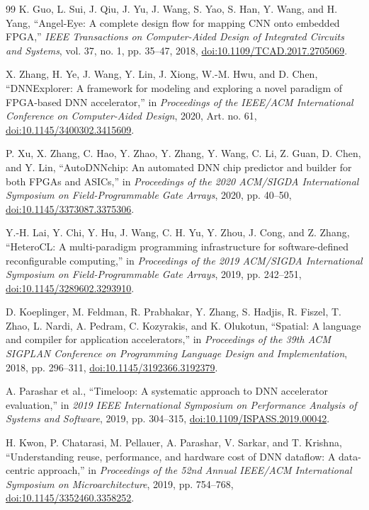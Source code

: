 \documentclass{article}
\newcommand{\doilink}[1]{\href{https://doi.org/#1}{doi:#1}}
\begin{document}
\begin{thebibliography}{99}
K. Guo, L. Sui, J. Qiu, J. Yu, J. Wang, S. Yao, S. Han, Y. Wang, and H. Yang,
``Angel-Eye: A complete design flow for mapping CNN onto embedded FPGA,''
\emph{IEEE Transactions on Computer-Aided Design of Integrated Circuits and Systems},
vol. 37, no. 1, pp. 35--47, 2018, \doilink{10.1109/TCAD.2017.2705069}.

X. Zhang, H. Ye, J. Wang, Y. Lin, J. Xiong, W.-M. Hwu, and D. Chen,
``DNNExplorer: A framework for modeling and exploring a novel paradigm of FPGA-based DNN accelerator,''
in \emph{Proceedings of the IEEE/ACM International Conference on Computer-Aided Design},
2020, Art. no. 61, \doilink{10.1145/3400302.3415609}.

P. Xu, X. Zhang, C. Hao, Y. Zhao, Y. Zhang, Y. Wang, C. Li, Z. Guan, D. Chen, and Y. Lin,
``AutoDNNchip: An automated DNN chip predictor and builder for both FPGAs and ASICs,''
in \emph{Proceedings of the 2020 ACM/SIGDA International Symposium on Field-Programmable Gate Arrays},
2020, pp. 40--50, \doilink{10.1145/3373087.3375306}.

Y.-H. Lai, Y. Chi, Y. Hu, J. Wang, C. H. Yu, Y. Zhou, J. Cong, and Z. Zhang,
``HeteroCL: A multi-paradigm programming infrastructure for software-defined reconfigurable computing,''
in \emph{Proceedings of the 2019 ACM/SIGDA International Symposium on Field-Programmable Gate Arrays},
2019, pp. 242--251, \doilink{10.1145/3289602.3293910}.

D. Koeplinger, M. Feldman, R. Prabhakar, Y. Zhang, S. Hadjis, R. Fiszel,
T. Zhao, L. Nardi, A. Pedram, C. Kozyrakis, and K. Olukotun,
``Spatial: A language and compiler for application accelerators,''
in \emph{Proceedings of the 39th ACM SIGPLAN Conference on Programming Language Design and Implementation},
2018, pp. 296--311, \doilink{10.1145/3192366.3192379}.

A. Parashar et al.,
``Timeloop: A systematic approach to DNN accelerator evaluation,''
in \emph{2019 IEEE International Symposium on Performance Analysis of Systems and Software},
2019, pp. 304--315, \doilink{10.1109/ISPASS.2019.00042}.

H. Kwon, P. Chatarasi, M. Pellauer, A. Parashar, V. Sarkar, and T. Krishna,
``Understanding reuse, performance, and hardware cost of DNN dataflow: A data-centric approach,''
in \emph{Proceedings of the 52nd Annual IEEE/ACM International Symposium on Microarchitecture},
2019, pp. 754--768, \doilink{10.1145/3352460.3358252}.


\end{thebibliography}
\end{document}
